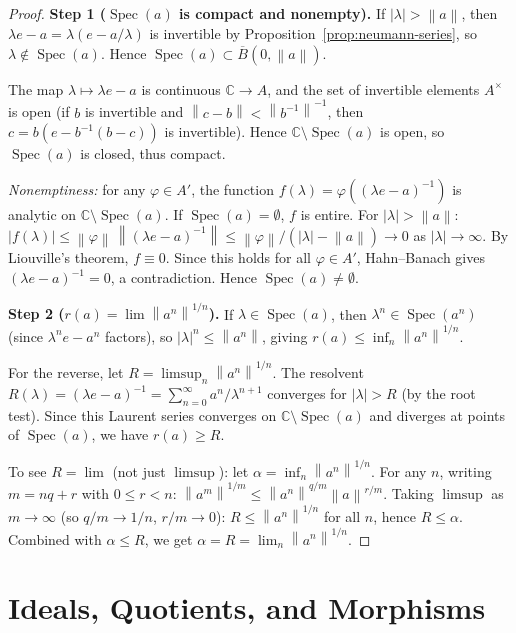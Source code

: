\documentclass[a4paper,12pt]{book}
\DeclareMathOperator{\Spec}{Spec}
\newcommand{\C}{\mathbb{C}}
\newcommand{\norm}[1]{\left\| #1 \right\|}
\newcommand{\abs}[1]{\left| #1 \right|}
\theoremstyle{definition}
\theoremstyle{plain}
\theoremstyle{remark}
\begin{document}
\begin{proof}
\textbf{Step 1 ($\Spec(a)$ is compact and nonempty).}
If $\abs{\lambda} > \norm{a}$, then $\lambda e - a = \lambda(e - a/\lambda)$ is
invertible by Proposition~\ref{prop:neumann-series}, so $\lambda \notin \Spec(a)$.
Hence $\Spec(a) \subset \overline{B}(0, \norm{a})$.

The map $\lambda \mapsto \lambda e - a$ is continuous $\C \to A$, and the set
of invertible elements $A^\times$ is open (if $b$ is invertible and
$\norm{c - b} < \norm{b^{-1}}^{-1}$, then $c = b(e - b^{-1}(b - c))$ is
invertible). Hence $\C \setminus \Spec(a)$ is open, so $\Spec(a)$ is closed,
thus compact.

\emph{Nonemptiness:} for any $\varphi \in A'$, the function
$f(\lambda) = \varphi((\lambda e - a)^{-1})$ is analytic on $\C \setminus \Spec(a)$.
If $\Spec(a) = \emptyset$, $f$ is entire. For $\abs{\lambda} > \norm{a}$:
$\abs{f(\lambda)} \le \norm{\varphi}\, \norm{(\lambda e - a)^{-1}}
\le \norm{\varphi}/(\abs{\lambda} - \norm{a}) \to 0$ as $\abs{\lambda} \to \infty$.
By Liouville's theorem, $f \equiv 0$. Since this holds
for all $\varphi \in A'$, Hahn--Banach gives $(\lambda e - a)^{-1} = 0$, a
contradiction. Hence $\Spec(a) \ne \emptyset$.

\textbf{Step 2 ($r(a) = \lim \norm{a^n}^{1/n}$).}
If $\lambda \in \Spec(a)$, then $\lambda^n \in \Spec(a^n)$ (since $\lambda^n e - a^n$
factors), so $\abs{\lambda}^n \le \norm{a^n}$, giving
$r(a) \le \inf_n \norm{a^n}^{1/n}$.

For the reverse, let $R = \limsup_n \norm{a^n}^{1/n}$. The resolvent
$R(\lambda) = (\lambda e - a)^{-1} = \sum_{n=0}^\infty a^n/\lambda^{n+1}$
converges for $\abs{\lambda} > R$ (by the root test). Since this Laurent series
converges on $\C \setminus \Spec(a)$ and diverges at points of $\Spec(a)$,
we have $r(a) \ge R$.

To see $R = \lim$ (not just $\limsup$): let $\alpha = \inf_n \norm{a^n}^{1/n}$.
For any $n$, writing $m = nq + r$ with $0 \le r < n$:
$\norm{a^m}^{1/m} \le \norm{a^n}^{q/m}\norm{a}^{r/m}$. Taking $\limsup$ as
$m \to \infty$ (so $q/m \to 1/n$, $r/m \to 0$):
$R \le \norm{a^n}^{1/n}$ for all $n$, hence $R \le \alpha$. Combined with
$\alpha \le R$, we get $\alpha = R = \lim_n \norm{a^n}^{1/n}$.
\end{proof}


\section{Ideals, Quotients, and Morphisms}\label{sec:ideals-quotients}
\end{document}
